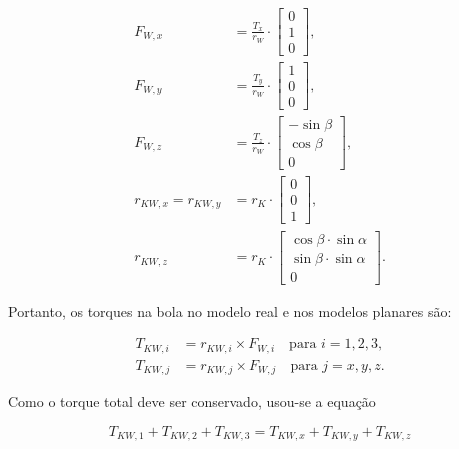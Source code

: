 \begin{equation}
    \begin{aligned}
    F_{W,x} &= \frac{T_x}{r_W} \cdot 
    \begin{bmatrix}
    0 \\ 
    1 \\ 
    0
    \end{bmatrix}, \\
    F_{W,y} &= \frac{T_y}{r_W} \cdot 
    \begin{bmatrix}
    1 \\ 
    0 \\ 
    0
    \end{bmatrix}, \\
    F_{W,z} &= \frac{T_z}{r_W} \cdot 
    \begin{bmatrix}
    -\sin \beta \\ 
    \cos \beta \\ 
    0
    \end{bmatrix}, \\
    r_{KW,x} = r_{KW,y} &= r_K \cdot 
    \begin{bmatrix}
    0 \\ 
    0 \\ 
    1
    \end{bmatrix}, \\
    r_{KW,z} &= r_K \cdot 
    \begin{bmatrix}
    \cos \beta \cdot \sin \alpha \\ 
    \sin \beta \cdot \sin \alpha \\ 
    0
    \end{bmatrix}.
    \end{aligned}
\end{equation}

Portanto, os torques na bola no modelo real e nos modelos planares são:

\begin{equation}
    \begin{aligned}
    T_{KW,i} &= r_{KW,i} \times F_{W,i} \quad \text{para } i = 1, 2, 3, \\
    T_{KW,j} &= r_{KW,j} \times F_{W,j} \quad \text{para } j = x, y, z.
    \end{aligned}
\end{equation}

Como o torque total deve ser conservado, usou-se a equação

\begin{equation}
    T_{KW,1} + T_{KW,2} + T_{KW,3} = T_{KW,x} + T_{KW,y} + T_{KW,z}
\end{equation}


